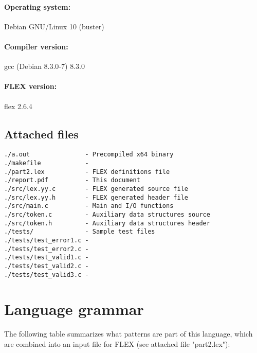 \documentclass[12pt]{article}
\begin{document}
\paragraph{Operating system:} Debian GNU/Linux 10 (buster)
\paragraph{Compiler version:} gcc (Debian 8.3.0-7) 8.3.0
\paragraph{FLEX version:} flex 2.6.4

\subsection{Attached files}

\begin{lstlisting}
./a.out               - Precompiled x64 binary
./makefile            - 
./part2.lex           - FLEX definitions file
./report.pdf          - This document
./src/lex.yy.c        - FLEX generated source file
./src/lex.yy.h        - FLEX generated header file
./src/main.c          - Main and I/O functions
./src/token.c         - Auxiliary data structures source
./src/token.h         - Auxiliary data structures header
./tests/              - Sample test files
./tests/test_error1.c - 
./tests/test_error2.c - 
./tests/test_valid1.c - 
./tests/test_valid2.c - 
./tests/test_valid3.c - 
\end{lstlisting}


\section{Language grammar}
The following table summarizes what patterns are part of this language, which
are combined into an input file for FLEX (see attached file "part2.lex"):
\end{document}
